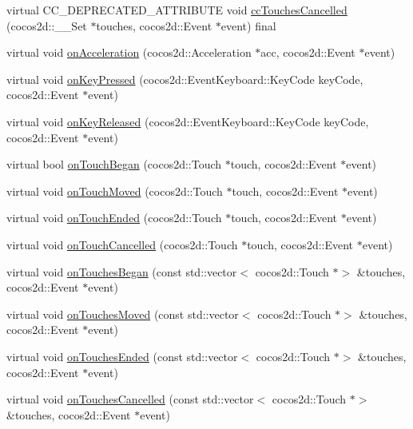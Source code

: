 \begin{DoxyCompactItemize}
\item 
virtual C\+C\+\_\+\+D\+E\+P\+R\+E\+C\+A\+T\+E\+D\+\_\+\+A\+T\+T\+R\+I\+B\+U\+TE void \hyperlink{classcocostudio_1_1InputDelegate_a2573e45679c130aeb3c045309a61f35d}{cc\+Touches\+Cancelled} (cocos2d\+::\+\_\+\+\_\+\+Set $\ast$touches, cocos2d\+::\+Event $\ast$event) final
\item 
virtual void \hyperlink{classcocostudio_1_1InputDelegate_af98f2dc1dcef808f77470e13d2c89102}{on\+Acceleration} (cocos2d\+::\+Acceleration $\ast$acc, cocos2d\+::\+Event $\ast$event)
\item 
virtual void \hyperlink{classcocostudio_1_1InputDelegate_a62704a6e8ad02c335c75d06cbaed3550}{on\+Key\+Pressed} (cocos2d\+::\+Event\+Keyboard\+::\+Key\+Code key\+Code, cocos2d\+::\+Event $\ast$event)
\item 
virtual void \hyperlink{classcocostudio_1_1InputDelegate_aa58c346c9746d193c23eba5988b93490}{on\+Key\+Released} (cocos2d\+::\+Event\+Keyboard\+::\+Key\+Code key\+Code, cocos2d\+::\+Event $\ast$event)
\item 
virtual bool \hyperlink{classcocostudio_1_1InputDelegate_afe6eee9c2022a94a86e1261f6b751a8c}{on\+Touch\+Began} (cocos2d\+::\+Touch $\ast$touch, cocos2d\+::\+Event $\ast$event)
\item 
virtual void \hyperlink{classcocostudio_1_1InputDelegate_adc37729914cd05f43538d18ee14abfce}{on\+Touch\+Moved} (cocos2d\+::\+Touch $\ast$touch, cocos2d\+::\+Event $\ast$event)
\item 
virtual void \hyperlink{classcocostudio_1_1InputDelegate_a645cfb7944ef4878e6de5904d48bf310}{on\+Touch\+Ended} (cocos2d\+::\+Touch $\ast$touch, cocos2d\+::\+Event $\ast$event)
\item 
virtual void \hyperlink{classcocostudio_1_1InputDelegate_aa82e9e391c01c1349f5e7c7d0745b6b5}{on\+Touch\+Cancelled} (cocos2d\+::\+Touch $\ast$touch, cocos2d\+::\+Event $\ast$event)
\item 
virtual void \hyperlink{classcocostudio_1_1InputDelegate_a213fa0908e0b5d7f3164e962fe8e87dc}{on\+Touches\+Began} (const std\+::vector$<$ cocos2d\+::\+Touch $\ast$$>$ \&touches, cocos2d\+::\+Event $\ast$event)
\item 
virtual void \hyperlink{classcocostudio_1_1InputDelegate_ad81bf5704d33542be199908c064f6a3e}{on\+Touches\+Moved} (const std\+::vector$<$ cocos2d\+::\+Touch $\ast$$>$ \&touches, cocos2d\+::\+Event $\ast$event)
\item 
virtual void \hyperlink{classcocostudio_1_1InputDelegate_a164a9ec9e876eb6d9a7121c50ba85d0e}{on\+Touches\+Ended} (const std\+::vector$<$ cocos2d\+::\+Touch $\ast$$>$ \&touches, cocos2d\+::\+Event $\ast$event)
\item 
virtual void \hyperlink{classcocostudio_1_1InputDelegate_ac41eb0712f1d38b0ecb59426628f5ec3}{on\+Touches\+Cancelled} (const std\+::vector$<$ cocos2d\+::\+Touch $\ast$$>$ \&touches, cocos2d\+::\+Event $\ast$event)
\end{DoxyCompactItemize}
